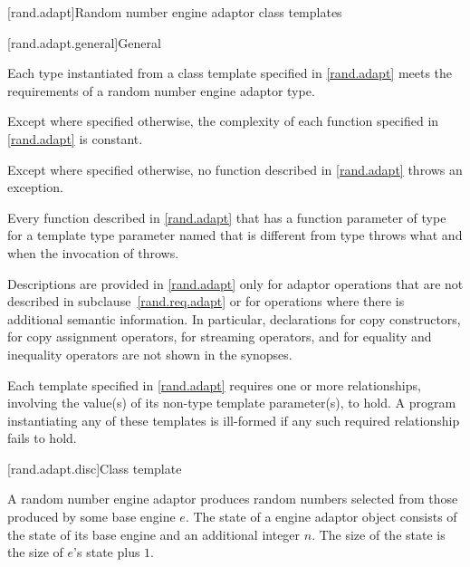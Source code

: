 

[rand.adapt]{Random number engine adaptor class templates}

[rand.adapt.general]{General}

\pnum
Each type instantiated
from a class template specified in \ref{rand.adapt}
meets the requirements
of a random number engine adaptor type.

\pnum
Except where specified otherwise,
the complexity of each function
specified in \ref{rand.adapt}
is constant.

\pnum
Except where specified otherwise,
no function described in \ref{rand.adapt}
throws an exception.

\pnum
Every function described in \ref{rand.adapt}
that has a function parameter  of type 
for a template type parameter named 
that is different from type 
throws what and when the invocation of  throws.

\pnum
Descriptions are provided in \ref{rand.adapt}
only for adaptor operations
that are not described in subclause~\ref{rand.req.adapt}
or for operations where there is additional semantic information.
In particular,
declarations for copy constructors,
for copy assignment operators,
for streaming operators,
and for equality and inequality operators
are not shown in the synopses.

\pnum
Each template specified in \ref{rand.adapt}
requires one or more relationships,
involving the value(s) of its non-type template parameter(s), to hold.
A program instantiating any of these templates
is ill-formed
if any such required relationship fails to hold.


[rand.adapt.disc]{Class template }%
%

\pnum
A  random number engine adaptor
produces random numbers
selected from those produced by some base engine $e$.
The state 
of a  engine adaptor object 
consists of the state  of its base engine 
and an additional integer $n$.
The size of the state is
 the size of $e$'s state plus $1$.

